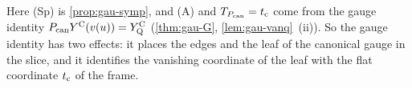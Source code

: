 Here (Sp) is \cref{prop:gau-symp}, and (A) and $T_{P_{\mathrm{can}}}=t_{\mathrm{c}}$ come from the gauge identity $P_{\mathrm{can}}Y^{\mathrm{C}}(v(u))=Y^{\mathrm{C}}_{\mathrm{Q}}$ (\cref{thm:gau-G}, \cref{lem:gau-vanq}~(ii)). So the gauge identity has two effects: it places the edges and the leaf of the canonical gauge in the slice, and it identifies the vanishing coordinate of the leaf with the flat coordinate $t_{\mathrm{c}}$ of the frame.


